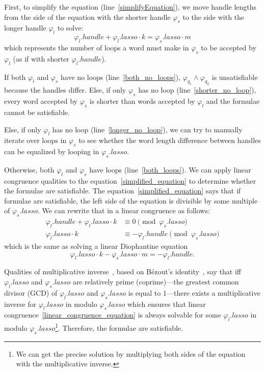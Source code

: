 First, to simplify the equation (line~\ref{simplifyEquation}), we move handle lengths from the side of the equation with the shorter handle $\varphi_s$ to the side with the longer handle $\varphi_l$ to solve:
\begin{equation}\label{simplified_equation}
    \varphi_{l}.handle + \varphi_{l}.lasso \cdot k = \varphi_{s}.lasso \cdot m
\end{equation}
which represents the number of loops a word must make in $\varphi_{s}$ to be accepted by $\varphi_l$ (as if with shorter $\varphi_l.handle$).

If both $\varphi_l$ and $\varphi_s$ have no loops (line~\ref{both_no_loops}), $\varphi_{q_1} \land \varphi_{q_2}$ is unsatisfiable because the handles differ. Else, if only $\varphi_s$ has no loop (line~\ref{shorter_no_loop}), every word accepted by $\varphi_s$ is shorter than words accepted by $\varphi_l$ and the formulae cannot be satisfiable.

Else, if only $\varphi_l$ has no loop (line~\ref{longer_no_loop}), we can try to manually iterate over loops in $\varphi_s$ to see whether the word length difference between handles can be equalized by looping in $\varphi_s.lasso$.

Otherwise, both $\varphi_l$ and $\varphi_s$ have loops (line~\ref{both_loops}). We can apply linear congruence qualities to the equation~\ref{simplified_equation} to determine whether the formulae are satisfiable. The equation~\ref{simplified_equation} says that if formulae are satisfiable, the left side of the equation is divisible by some multiple of $\varphi_s.lasso$. We can rewrite that in a linear congruence as follows:
\begin{align}
    \varphi_{l}.handle + \varphi_{l}.lasso \cdot k &\equiv 0 \pmod{\varphi_s.lasso} \\
    \varphi_{l}.lasso \cdot k &\equiv - \varphi_{l}.handle  \pmod{\varphi_s.lasso} \label{linear_congruence_equation}
\end{align}
which is the same as solving a linear Diophantine equation
\begin{equation}
    \varphi_{l}.lasso \cdot k - \varphi_s.lasso \cdot m = - \varphi_{l}.handle \text{.} \label{linear_diophantine_equation}
\end{equation}

Qualities of multiplicative inverse~\cite{DivisibilityAndGreatestCommonDiviser, LinearCongruences}, based on Bézout's identity~\cite{DivisibilityAndGreatestCommonDiviser}, say that iff $\varphi_l.lasso$ and $\varphi_s.lasso$ are relatively prime (coprime)---the greatest common divisor (GCD) of $\varphi_l.lasso$ and $\varphi_s.lasso$ is equal to $1$---there exists a multiplicative inverse for $\varphi_l.lasso$ in modulo $\varphi_s.lasso$ which ensures that linear congruence~\ref{linear_congruence_equation} is always solvable for some $\varphi_l.lasso$ in modulo $\varphi_s.lasso$\footnote{We can get the precise solution by multiplying both sides of the equation with the multiplicative inverse.}. Therefore, the formulae are satisfiable.

